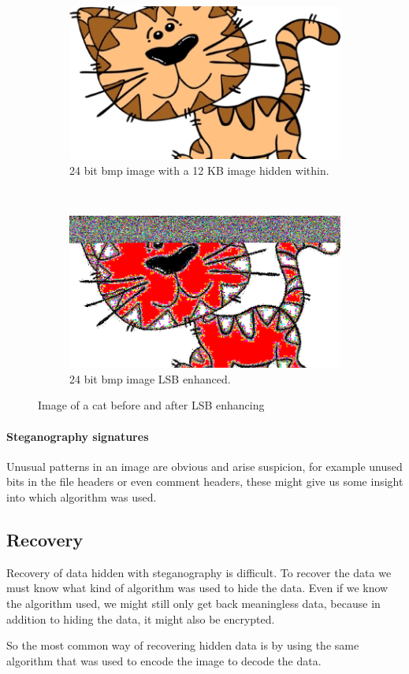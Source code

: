 \begin{figure}
    \centering
    \begin{subfigure}[b]{0.45\textwidth}
		\includegraphics[width=\textwidth]{figures/cat.jpg}
		\caption{24 bit bmp image with a 12 KB image hidden within. \citep{imgCat}}
		\label{fig:hiddenAAU}
	\end{subfigure}
	~
	\begin{subfigure}[b]{0.45\textwidth}
		\includegraphics[width=\textwidth]{figures/Cat_LSBEnhanced.png}
		\caption{24 bit bmp image LSB enhanced.}
		\label{fig:LSBenhanced}
	\end{subfigure}
	\caption{Image of a cat before and after LSB enhancing}
\end{figure}

\paragraph*{Steganography signatures}
Unusual patterns in an image are obvious and arise suspicion, for example unused bits in the file headers or even comment headers, these might give us some insight into which algorithm was used.

\subsection{Recovery}
Recovery of data hidden with steganography is difficult. To recover the data we must know what kind of algorithm was used to hide the data.
Even if we know the algorithm used, we might still only get back meaningless data, because in addition to hiding the data, it might also be encrypted.

So the most common way of recovering hidden data is by using the same algorithm that was used to encode the image to decode the data.
